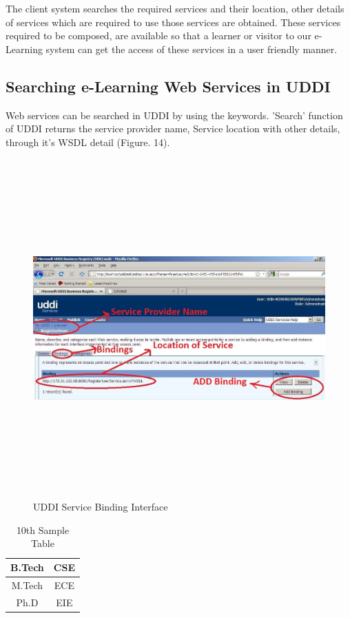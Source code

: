The client system searches the required services and their location, other details of services which are required to use those 
services are obtained. These services required to be composed, are available so that a learner or visitor to our 
e-Learning system can get the access of these services in a user friendly manner. 
\subsection{Searching e-Learning Web Services in UDDI}
Web services can be searched in UDDI by using the keywords. 'Search' function of UDDI returns the service provider name, Service location 
with other details, through it’s WSDL detail (Figure. 14).
\begin{figure}[h!]
 \centering
 \includegraphics[width=16cm,height=13cm]{uddi_service_binding_interface.jpg}
 \caption{UDDI Service Binding Interface}
\end{figure}

\begin{table}
 \begin{center}
 \caption{10th Sample Table}
 \begin{tabular}{|c|c|}
 \hline
 B.Tech & CSE\\
 \hline
 M.Tech & ECE\\
 \hline
 Ph.D & EIE\\
 \hline 
 \end{tabular}
 \end{center}
\end{table}
